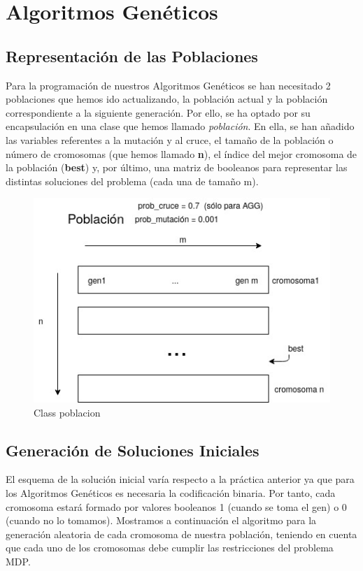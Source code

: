 \section{Algoritmos Genéticos}


\subsection{Representación de las Poblaciones}


Para la programación de nuestros Algoritmos Genéticos se han necesitado 2 poblaciones que hemos ido actualizando, la población actual y la población correspondiente a la siguiente generación. Por ello, se ha optado por su encapsulación en una clase que hemos llamado \textit{población}. En ella, se han añadido las variables referentes a la mutación y al cruce, el tamaño de la población o número de cromosomas (que hemos llamado \textbf{n}), el índice del mejor cromosoma de la población (\textbf{best}) y, por último, una matriz de booleanos para representar las distintas soluciones del problema (cada una de tamaño m). \\


\begin{figure}[H]
	\centering
	\includegraphics[scale=0.75]{img/a1.jpg}
	\caption{Class poblacion}
\end{figure}


\newpage 
\subsection{Generación de Soluciones Iniciales}
El esquema de la solución inicial varía respecto a la práctica anterior ya que para los Algoritmos Genéticos es necesaria la codificación binaria. Por tanto, cada cromosoma estará formado por valores booleanos 1 (cuando se toma el gen) o 0 (cuando no lo tomamos). Mostramos a continuación el algoritmo para la generación aleatoria de cada cromosoma de nuestra población, teniendo en cuenta que cada uno de los cromosomas debe cumplir las restricciones del problema MDP.

